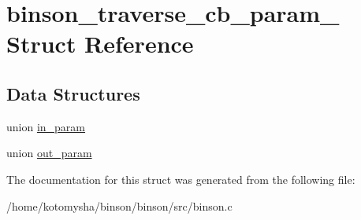 \hypertarget{structbinson__traverse__cb__param__}{\section{binson\-\_\-traverse\-\_\-cb\-\_\-param\-\_\- Struct Reference}
\label{structbinson__traverse__cb__param__}
}
\subsection*{Data Structures}
\begin{DoxyCompactItemize}
\item 
union \hyperlink{unionbinson__traverse__cb__param___1_1in__param}{in\-\_\-param}
\item 
union \hyperlink{unionbinson__traverse__cb__param___1_1out__param}{out\-\_\-param}
\end{DoxyCompactItemize}


The documentation for this struct was generated from the following file\-:\begin{DoxyCompactItemize}
\item 
/home/kotomysha/binson/binson/src/binson.\-c\end{DoxyCompactItemize}
